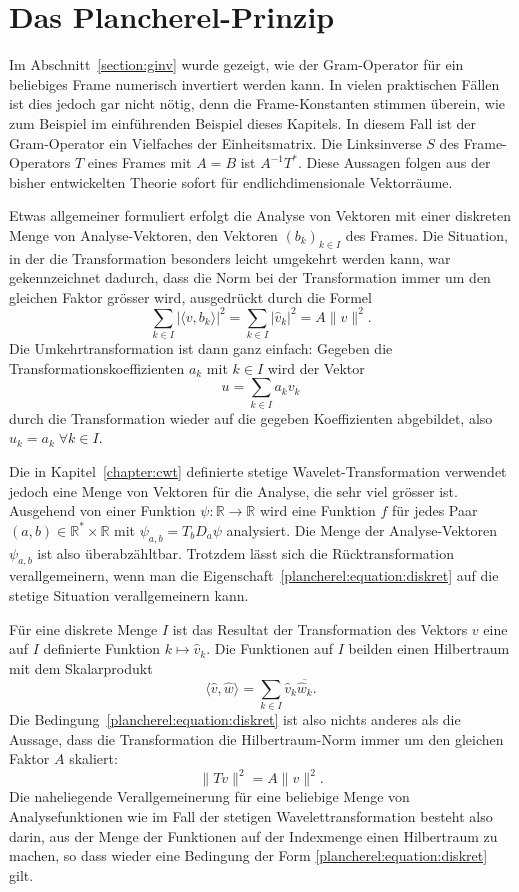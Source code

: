 %
%
%
\section{Das Plancherel-Prinzip
\label{section:plancherel}}
Im Abschnitt~\ref{section:ginv} wurde gezeigt, wie der Gram-Operator
für ein beliebiges Frame numerisch invertiert werden kann.
In vielen praktischen Fällen ist dies jedoch gar nicht nötig, denn
die Frame-Konstanten stimmen überein, wie zum Beispiel im einführenden
Beispiel dieses Kapitels.
In diesem Fall ist der Gram-Operator ein Vielfaches der Einheitsmatrix.
Die Linksinverse $S$ des Frame-Operators $T$ eines Frames mit $A=B$
ist $A^{-1}T^*$.
Diese Aussagen folgen aus der bisher entwickelten Theorie sofort
für endlichdimensionale Vektorräume.

Etwas allgemeiner formuliert erfolgt die Analyse von Vektoren
mit einer diskreten Menge von Analyse-Vektoren, den Vektoren $(b_k)_{k\in I}$
des Frames.
Die Situation, in der die Transformation besonders leicht umgekehrt werden
kann, war gekennzeichnet dadurch, dass die Norm bei der Transformation
immer um den gleichen Faktor grösser wird,
ausgedrückt durch die Formel
\begin{equation}
\sum_{k\in I} |\langle v,b_k\rangle|^2
=
\sum_{k\in I} |\hat{v}_k|^2
=
A\| v\|^2.
\label{plancherel:equation:diskret}
\end{equation}
Die Umkehrtransformation ist dann ganz einfach:
Gegeben die Transformationskoeffizienten $a_k$ mit $k\in I$ wird der Vektor
\[
u = \sum_{k\in I} a_k v_k
\]
durch die Transformation wieder auf die gegeben Koeffizienten abgebildet,
also $\hat{u}_k = a_k\;\forall k\in I$.

Die in Kapitel~\ref{chapter:cwt} definierte stetige Wavelet-Transformation
verwendet jedoch eine Menge von Vektoren für die Analyse, die sehr viel
grösser ist.
Ausgehend von einer Funktion $\psi\colon\mathbb R\to\mathbb R$
wird eine Funktion $f$ für jedes Paar
$(a,b)\in \mathbb{R}^*\times \mathbb R$ mit
$\psi_{a,b}=T_bD_a\psi$ analysiert.
Die Menge der Analyse-Vektoren $\psi_{a,b}$ ist also überabzähltbar.
Trotzdem lässt sich die Rücktransformation verallgemeinern, wenn 
man die Eigenschaft~\eqref{plancherel:equation:diskret} auf die
stetige Situation verallgemeinern kann.

Für eine diskrete Menge $I$ ist das Resultat der Transformation des Vektors
$v$ eine auf $I$ definierte Funktion $k\mapsto \hat{v}_k$.
Die Funktionen auf $I$ beilden einen Hilbertraum mit dem Skalarprodukt
\[
\langle \hat{v},\hat{w}\rangle
=
\sum_{k\in I} \hat{v}_k \overline{\hat{w}_k}.
\]
Die Bedingung~\eqref{plancherel:equation:diskret} ist also nichts anderes
als die Aussage, dass die Transformation die Hilbertraum-Norm immer um
den gleichen Faktor $A$ skaliert:
\[
\| Tv \|^2 = A \| v\|^2.
\]
Die naheliegende Verallgemeinerung für eine beliebige Menge von
Analysefunktionen wie im Fall der stetigen Wavelettransformation
besteht also darin, aus der Menge der Funktionen auf der Indexmenge
einen Hilbertraum zu machen, so dass wieder eine Bedingung der Form
\eqref{plancherel:equation:diskret} gilt.

